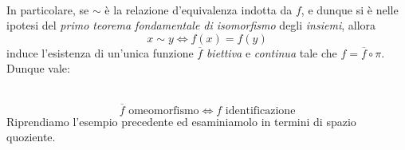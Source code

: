 \begin{minipage}[t]{0.16\textwidth}\vspace{-10pt}
	\end{minipage}\\
\hspace{-1mm}
\begin{minipage}[t]{0.83\textwidth}\vspace{2mm}
In particolare, se $\sim$ è la relazione d'equivalenza indotta da $f$, e dunque si è nelle ipotesi del \textit{primo teorema fondamentale di isomorfismo} degli \textit{insiemi}, allora
\begin{equation*}
	x\sim y \iff f(x)=f(y)
\end{equation*}
induce l'esistenza di un'unica funzione $\overline{f}$ \textit{biettiva} e \textit{continua} tale che $f=\overline{f}\circ \pi$. Dunque vale:
	 	\end{minipage}
	\begin{minipage}[t]{0.16\textwidth}\vspace{-1pt}
	\end{minipage}\vspace{-1.5mm}\\
\begin{equation*}
	\overline{f} \text{ omeomorfismo} \iff f \text{ identificazione}
\end{equation*}
\vspace{-1.5mm}\noindent Riprendiamo l'esempio precedente ed esaminiamolo in termini di spazio quoziente.
